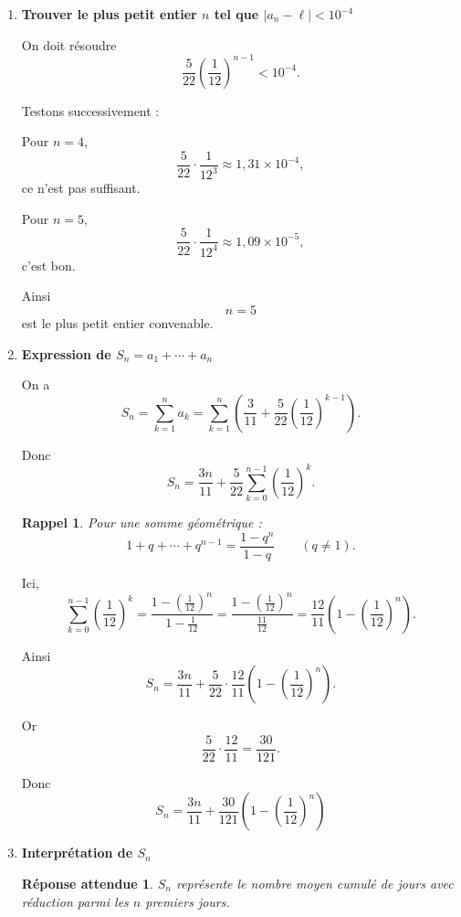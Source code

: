 \documentclass[11pt,a4paper]{article}
\newtheorem*{rappel}{Rappel}
\newtheorem*{reponseattendue}{Réponse attendue}
\begin{document}
\begin{enumerate}[label=\textbf{2.\arabic*}, resume, leftmargin=1.6em]

\item \textbf{Trouver le plus petit entier \(n\) tel que \(|a_n-\ell|<10^{-4}\)}

On doit résoudre
\[
\frac5{22}\left(\frac1{12}\right)^{n-1}<10^{-4}.
\]

Testons successivement :

Pour \(n=4\),
\[
\frac5{22}\cdot \frac1{12^3}\approx 1{,}31\times 10^{-4},
\]
ce n’est pas suffisant.

Pour \(n=5\),
\[
\frac5{22}\cdot \frac1{12^4}\approx 1{,}09\times 10^{-5},
\]
c’est bon.

Ainsi
\[
\boxed{n=5}
\]
est le plus petit entier convenable.

\item \textbf{Expression de \(S_n=a_1+\cdots +a_n\)}

On a
\[
S_n=\sum_{k=1}^n a_k
=\sum_{k=1}^n\left(\frac3{11}+\frac5{22}\left(\frac1{12}\right)^{k-1}\right).
\]

Donc
\[
S_n=\frac{3n}{11}+\frac5{22}\sum_{k=0}^{n-1}\left(\frac1{12}\right)^k.
\]

\begin{rappel}
Pour une somme géométrique :
\[
1+q+\cdots+q^{n-1}=\frac{1-q^n}{1-q}
\qquad (q\neq 1).
\]
\end{rappel}

Ici,
\[
\sum_{k=0}^{n-1}\left(\frac1{12}\right)^k
=\frac{1-\left(\frac1{12}\right)^n}{1-\frac1{12}}
=\frac{1-\left(\frac1{12}\right)^n}{\frac{11}{12}}
=\frac{12}{11}\left(1-\left(\frac1{12}\right)^n\right).
\]

Ainsi
\[
S_n=\frac{3n}{11}+\frac5{22}\cdot \frac{12}{11}\left(1-\left(\frac1{12}\right)^n\right).
\]

Or
\[
\frac5{22}\cdot \frac{12}{11}=\frac{30}{121}.
\]

Donc
\[
\boxed{
S_n=\frac{3n}{11}+\frac{30}{121}\left(1-\left(\frac1{12}\right)^n\right)
}
\]

\item \textbf{Interprétation de \(S_n\)}

\begin{reponseattendue}
\(S_n\) représente le nombre moyen cumulé de jours avec réduction parmi les \(n\) premiers jours.
\end{reponseattendue}

\end{enumerate}
\end{document}

